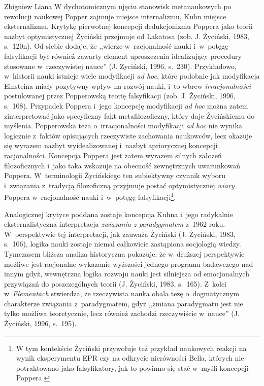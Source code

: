 \begin{artplenv}{Zbigniew Liana}
W dychotomicznym ujęciu stanowisk metanaukowych po rewolucji naukowej Popper zajmuje miejsce internalizmu, Kuhn miejsce
eksternalizmu. Krytykę pierwotnej koncepcji dedukcjonizmu Poppera jako teorii nazbyt optymistycznej Życiński przejmuje
od Lakatosa \label{ref:RNDCRLw5MmQwf}(zob. J. Życiński, 1983, s.~120n). Od siebie dodaje, że  ,,wierze w~racjonalność
nauki i~w~potęgę falsyfikacji był również zawarty element uproszczenia idealizujący procedury stosowane w~rzeczywistej
nauce'' \label{ref:RNDR9nCa1gaG1}(J. Życiński, 1996, s.~230).  Przykładowo, w~historii nauki istnieje wiele modyfikacji
\textit{ad hoc}, które podobnie jak modyfikacja Einsteina miały pozytywny wpływ na rozwój nauki, i~to wbrew
\textit{irracjonalności} postulowanej przez Popperowską teorię falsyfikacji \label{ref:RNDq9oApJerP4}(zob. J. Życiński,
1996, s.~108). Przypadek Poppera i~jego koncepcję modyfikacji \textit{ad hoc} można zatem zinterpretować jako specyficzny
fakt metafilozoficzny, który daje Życińskiemu do myślenia. Popperowska teza o~irracjonalności modyfikacji \textit{ad hoc}
nie wynika logicznie z~faktów opisujących rzeczywiste zachowania naukowców, lecz okazuje się wyrazem nazbyt
wyidealizowanej i~nazbyt apriorycznej koncepcji racjonalności. Koncepcja Poppera jest zatem wyrazem silnych założeń
filozoficznych i~jako taka wskazuje na obecność zewnętrznych uwarunkowań Poppera. W~terminologii Życińskiego ten
subiektywny czynnik wyboru i~związania z~tradycją filozoficzną przyjmuje postać optymistycznej \textit{wiary}
Poppera w~racjonalność nauki i~w~potęgę falsyfikacji\footnote{W tym kontekście Życiński przywołuje też przykład naukowych reakcji
na wynik eksperymentu EPR czy na  odkrycie nierówności Bella, których nie potraktowano jako falsyfikatory, jak to
powinno się stać w~myśli koncepcji Poppera.}.

Analogicznej krytyce poddana zostaje koncepcja Kuhna i~jego radykalnie eksternalistyczna interpretacja
\textit{związania z	paradygmatem} z~1962 roku. W~perspektywie tej interpretacji, jak zauważa Życiński \label{ref:RNDaETzNFGzG9}(J.
Życiński, 1983, s.~106), logika nauki zostaje niemal całkowicie zastąpiona socjologią wiedzy. Tymczasem bliższa analiza
historyczna pokazuje, że w~dłuższej perspektywie możliwe jest racjonalne wykazanie wyższości jednego programu
badawczego nad innym gdyż, wewnętrzna logika rozwoju nauki jest silniejsza od emocjonalnych przywiązań do
poszczególnych teorii \label{ref:RND184R61G3Ny}(J. Życiński, 1983, s.~165). Z~kolei w~\textit{Elementach} stwierdza, że
rzeczywista nauka obala tezę o~dogmatycznym charakterze związania z~paradygmatem, gdyż ,,zmiana paradygmatu jest nie
tylko możliwa teoretycznie, lecz również zachodzi rzeczywiście w~nauce'' \label{ref:RND8iXlMhyTs3}(J. Życiński, 1996, s.~195).


\end{artplenv}
